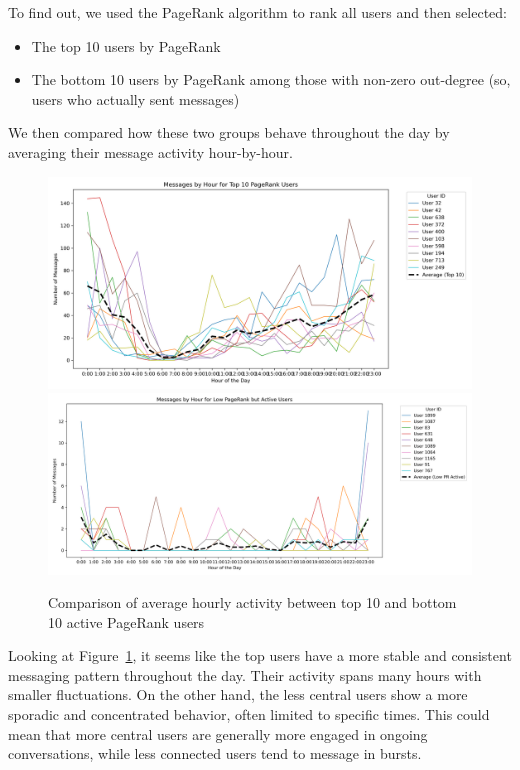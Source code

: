 To find out, we used the PageRank algorithm to rank all users and then selected:

\begin{itemize}
    \item The top 10 users by PageRank
    \item The bottom 10 users by PageRank among those with non-zero out-degree (so, users who actually sent messages)
\end{itemize}

We then compared how these two groups behave throughout the day by averaging their message activity hour-by-hour.

\begin{figure}[H]
    \centering
    \includegraphics[width=0.45\linewidth]{../Images/top10_users_individual_lines_with_average.png}
    \includegraphics[width=0.45\linewidth]{../Images/low_pr_active_users_with_average.png}
    \caption{Comparison of average hourly activity between top 10 and bottom 10 active PageRank users}
    \label{fig:top-vs-bottom}
\end{figure}

Looking at Figure~\ref{fig:top-vs-bottom}, it seems like the top users have a more stable and consistent messaging pattern throughout the day. Their activity spans many hours with smaller fluctuations. On the other hand, the less central users show a more sporadic and concentrated behavior, often limited to specific times. This could mean that more central users are generally more engaged in ongoing conversations, while less connected users tend to message in bursts.